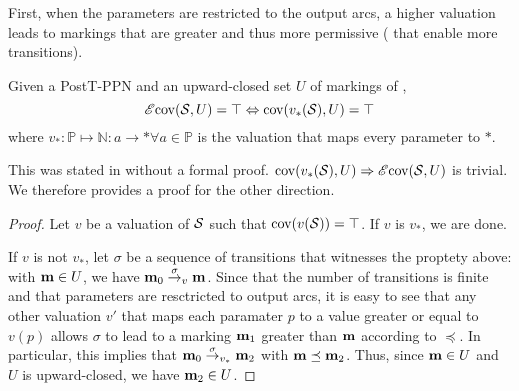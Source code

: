 First, when the parameters are restricted to the output arcs, a higher valuation leads to markings that are greater and thus more permissive ( that enable more transitions).

\begin{theo}
  Given a PostT-\ac{PPN} \SPTPm and an upward-closed set $U$ of markings of \PPN, \[\operatorname{\mathscr{E}cov}(\mathcal{S}, U) = \top \Leftrightarrow \operatorname{cov}(v_*(\mathcal{S}), U) = \top\] where $v_* : \mathbb{P} \mapsto \mathbb{N} : a \rightarrow * \forall a \in \mathbb{P}$ is the valuation that maps every parameter to $*$.
\end{theo}

This was stated in \cite{David17} without a formal proof.
$\operatorname{cov}(v_*(\mathcal{S}), U) \Rightarrow \operatorname{\mathscr{E}cov}(\mathcal{S}, U)$ is trivial.
We therefore provides a proof for the other direction.


\begin{proof}
  Let $v$ be a valuation of $\mathcal{S}$ such that $\operatorname{cov}(v(\mathcal{S})) = \top$.
  If $v$ is $v_*$, we are done.

  If $v$ is not $v_*$, let $\sigma$ be a sequence of transitions that witnesses the proptety above: with $\mathbf{m} \in U$, we have $\mathbf{m}_0 \stackrel{\sigma}{\to}_v \mathbf{m}$.
  Since that the number of transitions is finite and that parameters are resctricted to output arcs, it is easy to see that any other valuation $v'$ that maps each paramater $p$ to a value greater or equal to $v(p)$ allows $\sigma$ to lead to a marking $\mathbf{m}_1$ greater than $\mathbf{m}$ according to $\preceq$.
  In particular, this implies that $\mathbf{m}_0 \stackrel{\sigma}{\to}_{v_*} \mathbf{m}_2$ with $\mathbf{m} \preceq \mathbf{m}_2$.
  Thus, since $\mathbf{m} \in U$ and $U$ is upward-closed, we have $\mathbf{m}_2 \in U$.
\end{proof}
